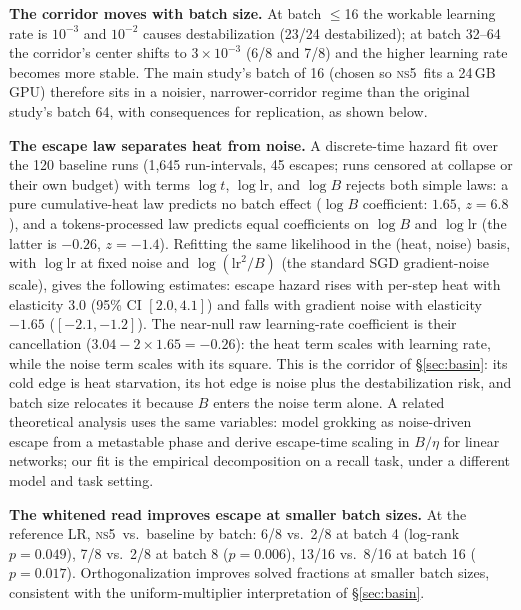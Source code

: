 \documentclass[11pt]{article}
\newcommand{\ns}{\textsc{ns5}}
\begin{document}
\textbf{The corridor moves with batch size.} At batch $\le$16 the workable
learning rate is $10^{-3}$ and $10^{-2}$ causes destabilization (23/24 destabilized); at
batch 32--64 the corridor's center shifts to $3{\times}10^{-3}$ (6/8 and 7/8) and
the higher learning rate becomes more stable. The main study's batch of 16 (chosen so
\ns\ fits a 24\,GB GPU) therefore sits in a noisier, narrower-corridor regime
than the original study's batch 64, with consequences for replication, as shown below.

\textbf{The escape law separates heat from noise.} A discrete-time hazard fit
over the 120 baseline runs (1{,}645 run-intervals, 45 escapes; runs censored at
collapse or their own budget) with terms $\log t$, $\log \mathrm{lr}$, and
$\log B$ rejects both simple laws: a pure cumulative-heat law predicts no batch
effect ($\log B$ coefficient: $1.65$, $z=6.8$), and a tokens-processed law
predicts equal coefficients on $\log B$ and $\log \mathrm{lr}$ (the latter is
$-0.26$, $z=-1.4$). Refitting the same likelihood in the (heat, noise) basis,
with $\log \mathrm{lr}$ at fixed noise and $\log(\mathrm{lr}^2/B)$ (the standard
SGD gradient-noise scale), gives the following estimates: escape hazard rises
with per-step heat with elasticity $3.0$ (95\% CI $[2.0, 4.1]$) and falls with
gradient noise with elasticity $-1.65$ ($[-2.1, -1.2]$). The near-null raw
learning-rate coefficient is their cancellation ($3.04 - 2\times1.65 = -0.26$):
the heat term scales with learning rate, while the noise term scales with its
square. This
is the corridor of \S\ref{sec:basin}: its cold edge is
heat starvation, its hot edge is noise plus the destabilization risk, and
batch size relocates it because $B$ enters the noise term alone. A related theoretical
analysis uses the same variables:
\citet{ersoy2026metastable} model grokking as noise-driven escape from a
metastable phase and derive escape-time scaling in $B/\eta$ for linear networks;
our fit is the empirical decomposition on a recall task, under a different model and task setting.

\textbf{The whitened read improves escape at smaller batch sizes.} At the
reference LR, \ns\ vs.\ baseline by batch: 6/8 vs.\ 2/8 at batch 4 (log-rank
$p=0.049$), 7/8 vs.\ 2/8 at batch 8 ($p=0.006$), 13/16 vs.\ 8/16 at batch 16
($p=0.017$). Orthogonalization improves solved fractions at smaller batch sizes,
consistent with the uniform-multiplier interpretation of \S\ref{sec:basin}.
\end{document}
